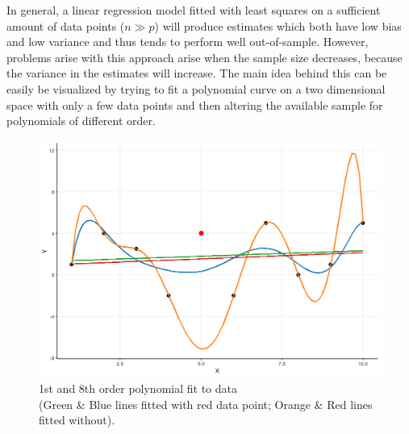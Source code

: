 \documentclass[12pt,a4paper]{article}
\begin{document}
In general, a linear regression model fitted with least squares on a sufficient amount of data points ($n \gg p$) will produce estimates which both have low bias and low variance and thus tends to perform well out-of-sample. However, problems arise with this approach arise when the sample size decreases, because the variance in the estimates will increase. The main idea behind this can be easily be visualized by trying to fit a polynomial curve on a two dimensional space with only a few data points and then altering the available sample for polynomials of different order. 
\begin{figure}
\centering
\includegraphics[scale=0.5]{PolynomialFit_Plot.png}
\caption{1st and 8th order polynomial fit to data \\ (\textcolor{green1}{Green} \& \textcolor{blue1}{Blue} lines fitted with red data point; \textcolor{orange1}{Orange} \& \textcolor{red1}{Red} lines fitted without).}
\label{fig:polyfit}
\end{figure}
\end{document}
